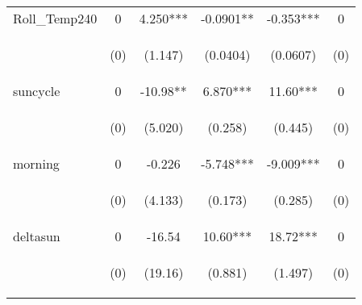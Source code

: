 \begin{center}
\begin{tabular}{lccccc}
Roll\_Temp240 & 0 & 4.250*** & -0.0901** & -0.353*** & 0 \\
\vspace{4pt} & \begin{footnotesize}(0)\end{footnotesize} & \begin{footnotesize}(1.147)\end{footnotesize} & \begin{footnotesize}(0.0404)\end{footnotesize} & \begin{footnotesize}(0.0607)\end{footnotesize} & \begin{footnotesize}(0)\end{footnotesize} \\
suncycle & 0 & -10.98** & 6.870*** & 11.60*** & 0 \\
\vspace{4pt} & \begin{footnotesize}(0)\end{footnotesize} & \begin{footnotesize}(5.020)\end{footnotesize} & \begin{footnotesize}(0.258)\end{footnotesize} & \begin{footnotesize}(0.445)\end{footnotesize} & \begin{footnotesize}(0)\end{footnotesize} \\
morning & 0 & -0.226 & -5.748*** & -9.009*** & 0 \\
\vspace{4pt} & \begin{footnotesize}(0)\end{footnotesize} & \begin{footnotesize}(4.133)\end{footnotesize} & \begin{footnotesize}(0.173)\end{footnotesize} & \begin{footnotesize}(0.285)\end{footnotesize} & \begin{footnotesize}(0)\end{footnotesize} \\
deltasun & 0 & -16.54 & 10.60*** & 18.72*** & 0 \\
\vspace{4pt} & \begin{footnotesize}(0)\end{footnotesize} & \begin{footnotesize}(19.16)\end{footnotesize} & \begin{footnotesize}(0.881)\end{footnotesize} & \begin{footnotesize}(1.497)\end{footnotesize} & \begin{footnotesize}(0)\end{footnotesize} \\

\end{tabular}
\end{center}
